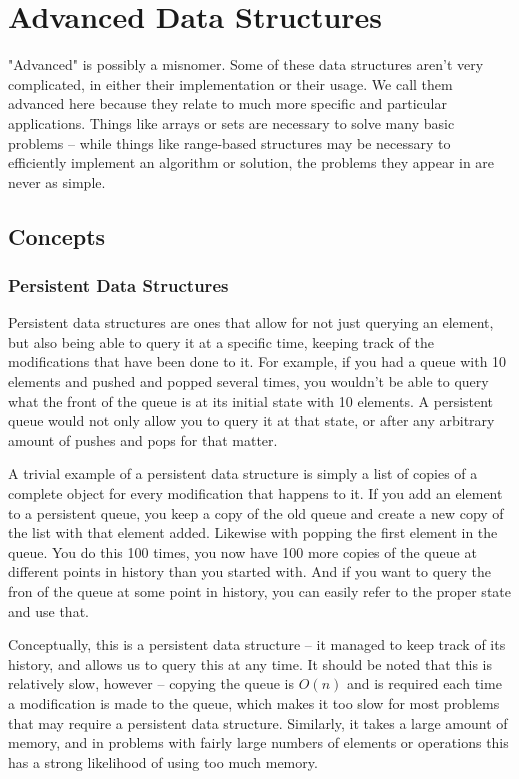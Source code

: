 \section{Advanced Data Structures}

"Advanced" is possibly a misnomer. Some of these data structures aren't very complicated, in either their implementation or their usage. We call them advanced here because they relate to much more specific and particular applications. Things like arrays or sets are necessary to solve many basic problems -- while things like range-based structures may be necessary to efficiently implement an algorithm or solution, the problems they appear in are never as simple.

\subsection{Concepts}

\subsubsection{Persistent Data Structures}

Persistent data structures are ones that allow for not just querying an element, but also being able to query it at a specific time, keeping track of the modifications that have been done to it. For example, if you had a queue with 10 elements and pushed and popped several times, you wouldn't be able to query what the front of the queue is at its initial state with 10 elements. A persistent queue would not only allow you to query it at that state, or after any arbitrary amount of pushes and pops for that matter.

A trivial example of a persistent data structure is simply a list of copies of a complete object for every modification that happens to it. If you add an element to a persistent queue, you keep a copy of the old queue and create a new copy of the list with that element added. Likewise with popping the first element in the queue. You do this 100 times, you now have 100 more copies of the queue at different points in history than you started with. And if you want to query the fron of the queue at some point in history, you can easily refer to the proper state and use that.

Conceptually, this is a persistent data structure -- it managed to keep track of its history, and allows us to query this at any time. It should be noted that this is relatively slow, however -- copying the queue is $O(n)$ and is required each time a modification is made to the queue, which makes it too slow for most problems that may require a persistent data structure. Similarly, it takes a large amount of memory, and in problems with fairly large numbers of elements or operations this has a strong likelihood of using too much memory.

